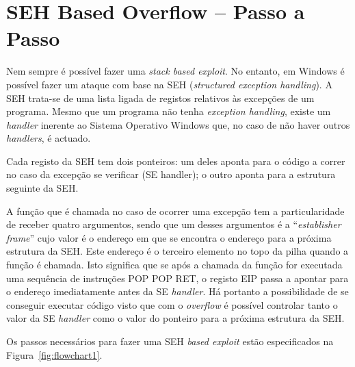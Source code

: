 \documentclass[11pt,a4paper]{article}
\begin{document}
\section{SEH Based Overflow -- Passo a Passo}
\label{sec:seh}

Nem sempre é possível fazer uma \textit{stack based exploit}. No entanto, em Windows é possível fazer um ataque com base na SEH (\textit{structured exception handling}). A SEH trata-se de uma lista ligada de registos relativos às excepções de um programa. Mesmo que um programa não tenha \textit{exception handling}, existe um \textit{handler} inerente ao Sistema Operativo Windows que, no caso de não haver outros \textit{handlers}, é actuado.

Cada registo da SEH tem dois ponteiros: um deles aponta para o código a correr no caso da excepção se verificar (SE handler); o outro aponta para a estrutura seguinte da SEH.

A função que é chamada no caso de ocorrer uma excepção tem a particularidade de receber quatro argumentos, sendo que um desses argumentos é a ``\textit{establisher frame}'' cujo valor é o endereço em que se encontra o endereço para a próxima estrutura da SEH. Este endereço é o terceiro elemento no topo da pilha quando a função é chamada. Isto significa que se após a chamada da função for executada uma sequência de instruções POP POP RET, o registo EIP passa a apontar para o endereço imediatamente antes da SE \textit{handler}. Há portanto a possibilidade de se conseguir executar código visto que com o \textit{overflow} é possível controlar tanto o valor da SE \textit{handler} como o valor do ponteiro para a próxima estrutura da SEH.

Os passos necessários para fazer uma SEH \textit{based exploit} estão especificados na Figura~\ref{fig:flowchart1}.

\end{document}
